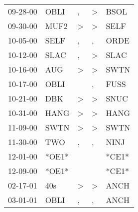\begin{supertabular}{p{0.07\textwidth}p{0.06\textwidth}p{0.02\textwidth}p{0.02\textwidth}p{0.06\textwidth}}
          09-28-00\textsuperscript{} &           OBLI\textsuperscript{} &                , &  \textgreater &  BSOL\textsuperscript{} \\
          09-30-00\textsuperscript{} &           MUF2\textsuperscript{} &     \textgreater &  \textgreater &  SELF\textsuperscript{} \\
          10-05-00\textsuperscript{} &           SELF\textsuperscript{} &                , &             , &  ORDE\textsuperscript{} \\
          10-12-00\textsuperscript{} &           SLAC\textsuperscript{} &                , &  \textgreater &  SLAC\textsuperscript{} \\
          10-16-00\textsuperscript{} &            AUG\textsuperscript{} &     \textgreater &  \textgreater &  SWTN\textsuperscript{} \\
          10-17-00\textsuperscript{} &           OBLI\textsuperscript{} &                  &             , &  FUSS\textsuperscript{} \\
          10-21-00\textsuperscript{} &            DBK\textsuperscript{} &     \textgreater &  \textgreater &  SNUC\textsuperscript{} \\
          10-31-00\textsuperscript{} &           HANG\textsuperscript{} &     \textgreater &  \textgreater &  HANG\textsuperscript{} \\
          11-09-00\textsuperscript{} &           SWTN\textsuperscript{} &     \textgreater &  \textgreater &  SWTN\textsuperscript{} \\
          11-30-00\textsuperscript{} &            TWO\textsuperscript{} &                , &             , &  NINJ\textsuperscript{} \\
          12-01-00\textsuperscript{} &                            *OE1* &                  &               &                   *CE1* \\
          12-09-00\textsuperscript{} &                            *OE1* &                  &               &                   *CE1* \\
          02-17-01\textsuperscript{} &            40s\textsuperscript{} &     \textgreater &  \textgreater &  ANCH\textsuperscript{} \\
          03-01-01\textsuperscript{} &           OBLI\textsuperscript{} &                , &             , &  ANCH\textsuperscript{} \\

\end{supertabular}
